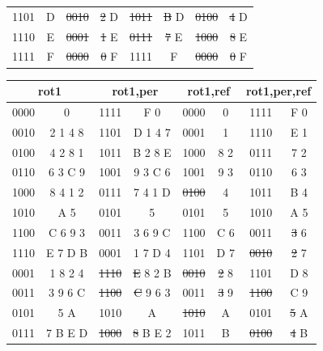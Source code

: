 \documentclass{ijuc}
\begin{document}
\begin{table}
\begin{center}
\begin{tabular}{cc|cc|cc|cc}
1101 & D              & \sout{0010} & \sout{2} D & \sout{1011} & \sout{B} D  & \sout{0100} & \sout{4} D     \\
1110 & E              & \sout{0001} & \sout{1} E & \sout{0111} & \sout{7} E  & \sout{1000} & \sout{8} E     \\
1111 & F              & \sout{0000} & \sout{0} F &       1111  &       F     & \sout{0000} & \sout{0} F     \\
\end{tabular}
\begin{tabular}{cc|cc|cc|cc}
\multicolumn{2}{c|}{rot1} & \multicolumn{2}{c|}{rot1,per} & \multicolumn{2}{c|}{rot1,ref} & \multicolumn{2}{c}{rot1,per,ref} \\ \hline
0000 & 0              &       1111  &       F  0     &       0000  &       0     &       1111  &       F  0     \\
0010 & 2 1 4 8        &       1101  &       D  1 4 7 &       0001  &       1     &       1110  &       E  1     \\
0100 & 4 2 8 1        &       1011  &       B  2 8 E &       1000  &       8  2  &       0111  &       7  2     \\
0110 & 6 3 C 9        &       1001  &       9  3 C 6 &       1001  &       9  3  &       0110  &       6  3     \\
1000 & 8 4 1 2        &       0111  &       7  4 1 D & \sout{0100} &       4     &       1011  &       B  4     \\
1010 & A 5            &       0101  &       5        &       0101  &       5     &       1010  &       A  5     \\
1100 & C 6 9 3        &       0011  &       3  6 9 C &       1100  &       C  6  &       0011  & \sout{3} 6     \\
1110 & E 7 D B        &       0001  &       1  7 D 4 &       1101  &       D  7  & \sout{0010} & \sout{2} 7     \\
0001 & 1 8 2 4        & \sout{1110} & \sout{E} 8 2 B & \sout{0010} & \sout{2} 8  &       1101  &       D  8     \\
0011 & 3 9 6 C        & \sout{1100} & \sout{C} 9 6 3 &       0011  & \sout{3} 9  & \sout{1100} &       C  9     \\
0101 & 5 A            &       1010  &       A        & \sout{1010} &       A     &       0101  & \sout{5} A     \\
0111 & 7 B E D        & \sout{1000} & \sout{8} B E 2 &       1011  &       B     & \sout{0100} & \sout{4} B     \\

\end{tabular}
\end{center}
\end{table}
\end{document}
